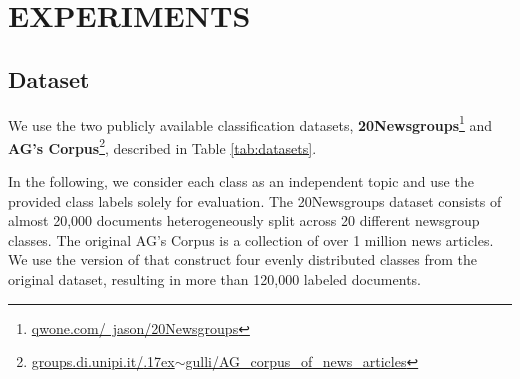 \documentclass[a4paper,twoside]{article}
\begin{document}
\section{\uppercase{Experiments}}
\label{sec:experiments}

\subsection{Dataset}
We use the two publicly available classification datasets, \textbf{20Newsgroups}\footnote{\href{http://qwone.com/~jason/20Newsgroups}{qwone.com/~jason/20Newsgroups}} and \textbf{AG's Corpus}\footnote{\href{http://groups.di.unipi.it/~gulli/AG_corpus_of_news_articles}{groups.di.unipi.it/{\raise.17ex\hbox{$\scriptstyle\sim$}}gulli/AG\_corpus\_of\_news\_articles}}, described in Table \ref{tab:datasets}. 
\begin{table}[ht]
    \centering
    \caption{\label{tab:datasets}Summary of the used classification datasets.}
\end{table}
In the following, we consider each class as an independent topic and use the provided class labels solely for evaluation. The 20Newsgroups dataset consists of almost 20,000 documents heterogeneously split across 20 different newsgroup classes. The original AG's Corpus is a collection of over 1 million news articles. We use the version of \citet{zhang-et-al-2015} that construct four evenly distributed classes from the original dataset, resulting in more than 120,000 labeled documents.
\end{document}
